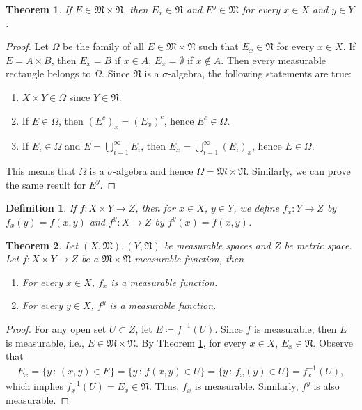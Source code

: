 \documentclass[11pt]{book}
\newtheorem{definition}{Definition}[chapter]
\newtheorem{theorem}{Theorem}[chapter]
\theoremstyle{definition}
\numberwithin{equation}{chapter}
\begin{document}
\medskip

\begin{theorem}\label{theorem_31}
If $E \in \mathfrak{M} \times \mathfrak{N}$, then $E_x \in \mathfrak{N}$ and $E^y \in \mathfrak{M}$ for every $x \in X$ and $y \in Y$.
\end{theorem}
\begin{proof}
Let $\Omega$ be the family of all $E \in \mathfrak{M} \times \mathfrak{N}$ such that $E_x \in \mathfrak{N}$ for every $x \in X$. If $E = A \times B$, then $E_x = B$ if $x \in A$, $E_x = \emptyset$ if $x \notin A$. Then every measurable rectangle belongs to $\Omega$. Since $\mathfrak{N}$ is a $\sigma$-algebra, the following statements are true:
\begin{enumerate}[label=(\alph*)]
    \item $X \times Y \in \Omega$ since $Y \in \mathfrak{N}$.
    
    \item If $E \in \Omega$, then $(E^c)_x = (E_x)^c$, hence $E^c \in \Omega$.
    
    \item If $E_i \in \Omega$ and $E = \bigcup^\infty_{i=1} E_i$, then $E_x = \bigcup^\infty_{i=1} (E_i)_x$, hence $E \in \Omega$.
\end{enumerate}
This means that $\Omega$ is a $\sigma$-algebra and hence $\Omega = \mathfrak{M} \times \mathfrak{N}$. Similarly, we can prove the same result for $E^y$.
\end{proof}

\medskip

\begin{definition}
If $f: X \times Y \to Z$, then for $x \in X$, $y \in Y$, we define $f_x: Y \to Z$ by $f_x(y) = f(x,y)$ and $f^y: X \to Z$ by $f^y(x) = f(x,y)$.
\end{definition}

\medskip

\begin{theorem}\label{theorem_32}
Let $(X,\mathfrak{M}), (Y,\mathfrak{N})$ be measurable spaces and $Z$ be metric space. Let $f:X \times Y \to Z$ be a $\mathfrak{M} \times \mathfrak{N}$-measurable function, then
\begin{enumerate}[label=(\alph*)]
    \item For every $x \in X$, $f_x$ is a measurable function.
    
    \item For every $y \in X$, $f^y$ is a measurable function.
\end{enumerate}
\end{theorem}
\begin{proof}
For any open set $U \subset Z$, let $E \coloneqq f^{-1}(U)$. Since $f$ is measurable, then $E$ is measurable, i.e., $E \in \mathfrak{M} \times \mathfrak{N}$. By Theorem \ref{theorem_31}, for every $x \in X$, $E_x \in \mathfrak{N}$. Observe that
\begin{align*}
    E_x = \{y \,:\, (x,y) \in E \} = \{y \,:\, f(x,y) \in U \} = \{y \,:\, f_x(y) \in U \} = f_x^{-1}(U),
\end{align*}
which implies $f_x^{-1}(U) = E_x \in \mathfrak{N}$. Thus, $f_x$ is measurable. Similarly, $f^y$ is also measurable.
\end{proof}
\end{document}
